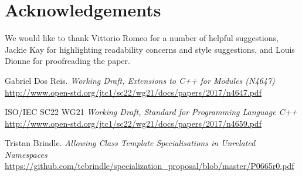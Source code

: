 \documentclass[reqno]{article}
\begin{document}
\section{Acknowledgements}

We would like to thank Vittorio Romeo for a number of helpful suggestions,
Jackie Kay for highlighting readability concerns and style suggestions, and
Louis Dionne for proofreading the paper.



\begin{thebibliography}{9}

    Gabriel Dos Reis.
        \textit{Working Draft, Extensions to C++ for Modules (N4647)}
        \url{http://www.open-std.org/jtc1/sc22/wg21/docs/papers/2017/n4647.pdf}

    ISO/IEC SC22 WG21
        \textit{Working Draft, Standard for Programming Language C++}
        \url{http://www.open-std.org/jtc1/sc22/wg21/docs/papers/2017/n4659.pdf}

    Tristan Brindle.
        \textit{Allowing Class Template Specialisations in Unrelated Namespaces}
        \url{https://github.com/tcbrindle/specialization_proposal/blob/master/P0665r0.pdf}

\end{thebibliography}
\end{document}
